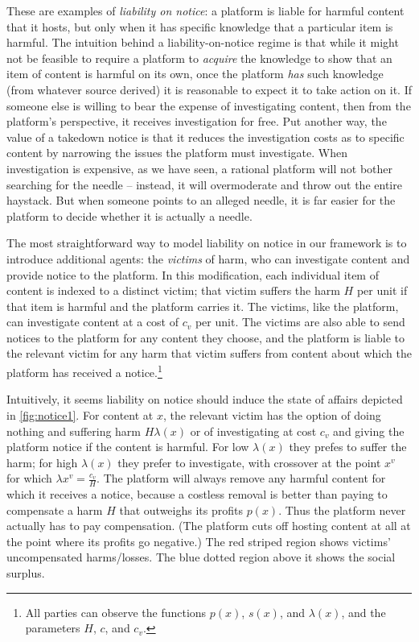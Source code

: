 These are examples of \emph{liability on notice}: a platform is liable for harmful content that it hosts, but only when it has specific knowledge that a particular item is harmful. The intuition behind a liability-on-notice regime is that while it might not be feasible to require a platform to \emph{acquire} the knowledge to show that an item of content is harmful on its own, once the platform \emph{has} such knowledge (from whatever source derived) it is reasonable to expect it to take action on it. If someone else is willing to bear the expense of investigating content, then from the platform's perspective, it receives investigation for free. Put another way, the value of a takedown notice is that it reduces the investigation costs as to specific content by narrowing the issues the platform must investigate. When investigation is expensive, as we have seen, a rational platform will not bother searching for the needle -- instead, it will overmoderate and throw out the entire haystack. But when someone points to an alleged needle, it is far easier for the platform to decide whether it is actually a needle.

The most straightforward way to model liability on notice in our framework is to introduce additional agents: the \emph{victims} of harm, who can investigate content and provide notice to the platform. In this modification, each individual item of content is indexed to a distinct victim; that victim suffers the harm $H$ per unit if that item is harmful and the platform carries it. The victims, like the platform, can investigate content at a cost of $c_v$ per unit. The victims are also able to send notices to the platform for any content they choose, and the platform is liable to the relevant victim for any harm that victim suffers from content about which the platform has received a notice.\footnote{All parties can observe the functions $p(x)$, $s(x)$, and $\lambda(x)$, and the parameters $H$, $c$, and $c_v$.}

Intuitively, it seems liability on notice should induce the state of affairs depicted in \autoref{fig:notice1}. For content at $x$, the relevant victim  has the option of doing nothing and suffering harm $H\lambda(x)$ or of investigating at cost $c_v$ and giving the platform notice if the content is harmful. For low $\lambda(x)$ they prefes to suffer the harm; for high $\lambda(x)$ they prefer to investigate, with crossover at the point $x^v$ for which $\lambda{x^v} = \frac{c_v}{H}$. The platform will always remove any harmful content for which it receives a notice, because a costless removal is better than paying to compensate a harm $H$ that outweighs its profits $p(x)$. Thus the platform never actually has to pay compensation. (The platform cuts off hosting content at all at the point where its profits go negative.) The red striped region shows victims' uncompensated harms/losses. The blue dotted region above it shows the social surplus.

